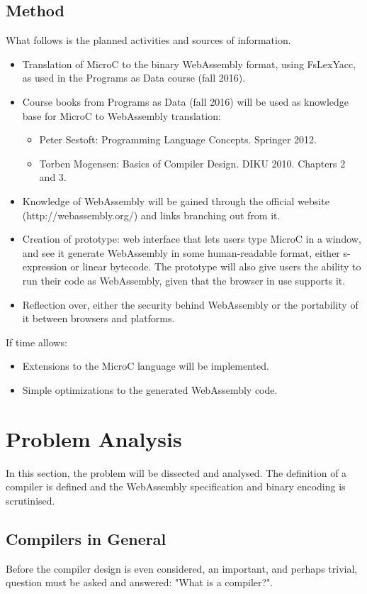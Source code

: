 \documentclass[a4paper]{article}
\makeatletter
\newcommand\footnoteref[1]{\protected@xdef\@thefnmark{\ref{#1}}\@footnotemark}
\makeatother
\begin{document}
\subsection{Method}
What follows is the planned activities and sources of information.
\begin{itemize}
	\item Translation of MicroC to the binary WebAssembly format, using FsLexYacc\footnoteref{footnote:fslexyacc-url}, as used in the Programs as Data course (fall 2016).
	\item Course books from Programs as Data (fall 2016) will be used as knowledge base for MicroC to WebAssembly translation:
		\begin{itemize}
			\item Peter Sestoft: Programming Language Concepts. Springer 2012.
			\item Torben Mogensen: Basics of Compiler Design. DIKU 2010. Chapters 2 and 3.
		\end{itemize}
	\item Knowledge of WebAssembly will be gained through the official website (http://webassembly.org/) and links branching out from it.
	\item Creation of prototype: web interface that lets users type MicroC in a window, and see it generate WebAssembly in some human-readable format, either s-expression or linear bytecode. The prototype will also give users the ability to run their code as WebAssembly, given that the browser in use supports it.
	\item Reflection over, either the security behind WebAssembly or the portability of it between browsers and platforms.
\end{itemize}

\noindent If time allows:
\begin{itemize}
	\item Extensions to the MicroC language will be implemented.
	\item Simple optimizations to the generated WebAssembly code.
\end{itemize}
\pagebreak

\section{Problem Analysis}
In this section, the problem will be dissected and analysed. The definition of a compiler is defined and the WebAssembly specification and binary encoding is scrutinised.

\subsection{Compilers in General}
Before the compiler design is even considered, an important, and perhaps trivial, question must be asked and answered: "What is a compiler?".
\end{document}
